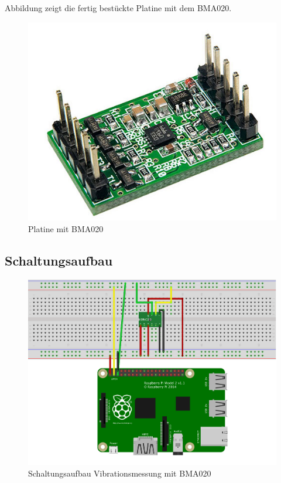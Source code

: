 Abbildung zeigt die fertig bestückte Platine mit dem BMA020.

\begin{figure}[!h] 
  \centering
     \includegraphics[scale=.4]{BilderAllgemein/Beschleunigungssensor.png}
  \caption{Platine mit BMA020 \citep{Bild_BMA020}}
  \label{Abb_HYT221}
\end{figure}
\newpage

\subsection{Schaltungsaufbau}
\label{subsection_Schaltungsaufbau_BMA020}

\begin{figure}[!h] 
  \centering
     \includegraphics[scale=.8]{BilderAllgemein/Schaltung_Vib.png}
  \caption{Schaltungsaufbau Vibrationsmessung mit  BMA020}
  \label{Abb_Schaltungsaufbau_BMA020}
\end{figure}

